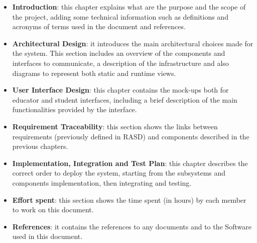 \begin{itemize}
    \item \textbf{Introduction}: this chapter explains what are the purpose and the scope of the project, adding some technical information such as definitions and acronyms of terms used in the document and references.
    \item \textbf{Architectural Design}: it introduces the main architectural choices made for the system. This section includes an overview of the components and interfaces to communicate, a description of the infrastructure and also diagrams to represent both static and runtime views.  
    \item \textbf{User Interface Design}: this chapter contains the mock-ups both for educator and student interfaces, including a brief description of the main functionalities provided by the interface. 
    \item \textbf{Requirement Traceability}: this section shows the links between requirements (previously defined in RASD) and components described in the previous chapters.
    \item \textbf{Implementation, Integration and Test Plan}: this chapter describes the correct order to deploy the system, starting from the subsystems and components implementation, then integrating and testing.   
    \item \textbf{Effort spent}: this section shows the time spent (in hours) by each member to work on this document.
    \item \textbf{References}: it contains the references to any documents and to the Software used in this document.
\end{itemize}
